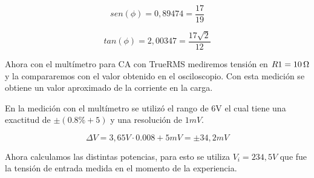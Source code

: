 \begin{equation*}
    sen(\phi) = 0,89474 = \frac{17}{19}
\end{equation*}

\begin{equation*}
    tan(\phi) = 2,00347 = \frac{17\sqrt{2}}{12}
\end{equation*}

Ahora con el multímetro para CA con TrueRMS mediremos tensión en $R1=10\ohm$ y la compararemos con el valor obtenido en el osciloscopio. Con esta medición se obtiene un valor aproximado de la corriente en la carga.

\begin{table}[H]
\centering
{}
\end{table}

En la medición con el multímetro se utilizó el rango de 6V el cual tiene una exactitud de $\pm(0.8\% + 5)$ y una resolución de $1mV$.


\begin{equation*}
    \Delta V = 3,65V \cdot 0.008 + 5mV = \pm 34,2 mV
\end{equation*}

Ahora calculamos las distintas potencias, para esto se utiliza $V_i= 234,5V$ que fue la tensión de entrada medida en el momento de la experiencia.

